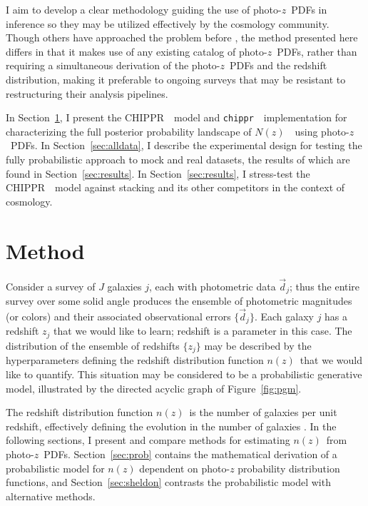 \documentclass[iop]{emulateapj}
\newcommand{\Sect}[1]{Section~\ref{#1}}
\newcommand{\Fig}[1]{Figure~\ref{#1}}
\newcommand{\project}[1]{{\textsc{#1}}~}
\newcommand{\Chippr}{\project{CHIPPR}}
\newcommand{\repo}[1]{{\texttt{#1}}~}
\newcommand{\chippr}{\repo{chippr}}
\newcommand{\nz}{$n(z)$}
\newcommand{\data}{\ensuremath{\vec{d}}}
\newcommand{\pz}{photo-$z$~}
\newcommand{\pzpdf}{\pz PDF}
\newcommand{\Nz}{$N(z)$~}
\begin{document}
I aim to develop a clear methodology guiding the use of \pzpdf s in inference 
so they may be utilized effectively by the cosmology community.
Though others have approached the problem before 
\citep{leistedt_hierarchical_2016}, the method presented here differs in that 
it makes use of any existing catalog of \pzpdf s, rather than requiring a 
simultaneous derivation of the \pzpdf s and the redshift distribution, making 
it preferable to ongoing surveys that may be resistant to restructuring their 
analysis pipelines.

In Section~\ref{sec:meth}, I present the \Chippr\ model and \chippr\ 
implementation for characterizing the full posterior probability landscape of 
\Nz\ using \pzpdf s. 
In Section~\ref{sec:alldata}, I describe the experimental design for testing 
the fully probabilistic approach to mock and real datasets, the results of 
which are found in Section~\ref{sec:results}.
In Section~\ref{sec:results}, I stress-test the \Chippr\ model against stacking 
and its other competitors in the context of cosmology.

\section{Method}
\label{sec:meth}

Consider a survey of $J$ galaxies $j$, each with photometric data $\data_{j}$; 
thus the entire survey over some solid angle produces the ensemble of 
photometric magnitudes (or colors) and their associated observational errors 
$\{\data_{j}\}$.  
Each galaxy $j$ has a redshift $z_{j}$ that we would like to learn; redshift is 
a parameter in this case.  
The distribution of the ensemble of redshifts $\{z_{j}\}$ may be described by 
the hyperparameters defining the redshift distribution function \nz\ that we 
would like to quantify.  
This situation may be considered to be a probabilistic generative model, 
illustrated by the directed acyclic graph of \Fig{fig:pgm}.  

The redshift distribution function \nz\ is the number of galaxies per unit 
redshift, effectively defining the evolution in the number of galaxies 
\citep{Menard2013}.  
In the following sections, I present and compare methods for estimating \nz\ 
from \pzpdf s.  
\Sect{sec:prob} contains the mathematical derivation of a probabilistic model 
for $n(z)$ dependent on photo-$z$ probability distribution functions, and 
\Sect{sec:sheldon} contrasts the probabilistic model with alternative methods.
\end{document}
